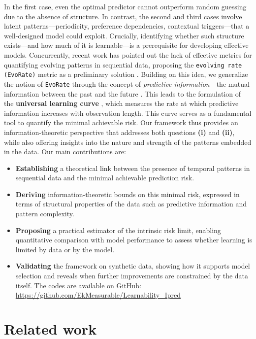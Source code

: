 \documentclass{article}
\begin{document}
In the first case, even the optimal predictor cannot outperform random guessing due to the absence of structure. In contrast, the second and third cases involve latent patterns—periodicity, preference dependencies, contextual triggers—that a well-designed model could exploit. Crucially, identifying whether such structure exists—and how much of it is learnable—is a prerequisite for developing effective models.
Concurrently, recent work has pointed out the lack of effective metrics for quantifying evolving patterns in sequential data, proposing the \texttt{evolving rate (EvoRate)} metric as a preliminary solution \cite{zeng2025towards}. Building on this idea, we generalize the notion of \texttt{EvoRate} through the concept of \emph{predictive information}—the mutual information between the past and the future \cite{bialek1999predictive, crutchfield1997statistical}. This leads to the formulation of the \textbf{universal learning curve} \cite{bialek1999predictive}, which measures the rate at which predictive information increases with observation length. This curve serves as a fundamental tool to quantify the minimal achievable risk. Our framework thus provides an information-theoretic perspective that addresses both questions \textbf{(i)} and \textbf{(ii)}, while also offering insights into the nature and strength of the patterns embedded in the data.
Our main contributions are:
\begin{itemize}
\item \textbf{Establishing} a theoretical link between the presence of temporal patterns in sequential data and the minimal achievable prediction risk.
\item \textbf{Deriving} information-theoretic bounds on this minimal risk, expressed in terms of structural properties of the data such as predictive information and pattern complexity.
\item \textbf{Proposing} a practical estimator of the intrinsic risk limit, enabling quantitative comparison with model performance to assess whether learning is limited by data or by the model.
\item \textbf{Validating} the framework on synthetic data, showing how it supports model selection and reveals when further improvements are constrained by the data itself. The codes are available on GitHub: \url{https://github.com/EkMeasurable/Learnability_Ipred}
\end{itemize}


\section{Related work}
\end{document}
